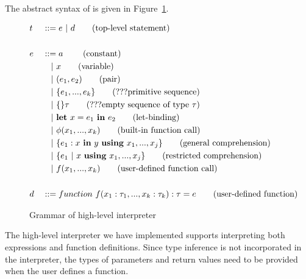 The abstract syntax of \mysnesl is given in Figure~\ref{fig-mysnesl}. 
 

\begin{figure}[H]\large
	\begin{alignat*}{2}
	& t &&::= e \ | \ d  \tag{top-level statement} \\
	\\
	& e &&::=  a \     \tag{constant} \\
	&   && \quad | \ x  \tag{variable} \\
	&   && \quad | \ (e_1,e_2) \tag{pair}\\
	&   && \quad | \ \{e_1,...,e_k \}	\tag{???primitive sequence} \\
	&   && \quad | \ \{ \}\tau			\tag{???empty sequence of type $\tau$} \\
	&   && \quad | \ \mathbf{let} \ x = e_1 \ \mathbf{in} \ e_2 \tag{let-binding}\\
	&   && \quad | \ \phi{(x_1,...,x_k)}  \tag{built-in function call} \\
	&   && \quad | \ \{e_1 : x \ \mathbf{in} \ y \ \mathbf{using} \ x_1,...,x_j\} \tag{general comprehension} \\
	&   && \quad | \ \{ e_1 \ | \ x \ \mathbf{using} \ x_1,...,x_j \} \tag {restricted comprehension} \\
	&   && \quad | \ f(x_1,...,x_k)  \tag {user-defined function call} \\
	\\
	& d &&::= function \  f(x_1: \tau_1, ..., x_k: \tau_k): \tau = e  \tag{user-defined function}
	\end{alignat*}
	\caption{Grammar of high-level interpreter \label{fig-mysnesl}}
\end{figure}

The high-level interpreter we have implemented supports interpreting both \mysnesl expressions and function definitions. 
Since type inference is not incorporated in the interpreter, the types of  parameters and return values need to be provided when the user defines a function.

